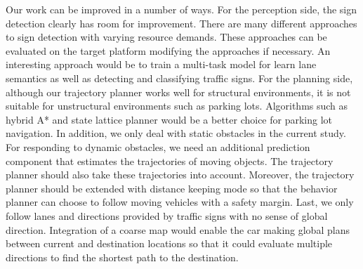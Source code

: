 Our work can be improved in a number of ways. For the perception side, the sign
detection clearly has room for improvement. There are many different approaches
to sign detection with varying resource demands. These approaches can be
evaluated on the target platform modifying the approaches if necessary. An
interesting approach would be to train a multi-task model for learn lane
semantics as well as detecting and classifying traffic signs. For the planning
side, although our trajectory planner works well for structural environments,
it is not suitable for unstructural environments such as parking lots.
Algorithms such as hybrid A* and state lattice planner would be a better choice
for parking lot navigation. In addition, we only deal with static obstacles in
the current study. For responding to dynamic obstacles, we need an additional
prediction component that estimates the trajectories of moving objects. The
trajectory planner should also take these trajectories into account. Moreover,
the trajectory planner should be extended with distance keeping mode so that
the behavior planner can choose to follow moving vehicles with a safety margin.
Last, we only follow lanes and directions provided by traffic signs with no
sense of global direction. Integration of a coarse map would enable the car
making global plans between current and destination locations so that it could
evaluate multiple directions to find the shortest path to the destination.
